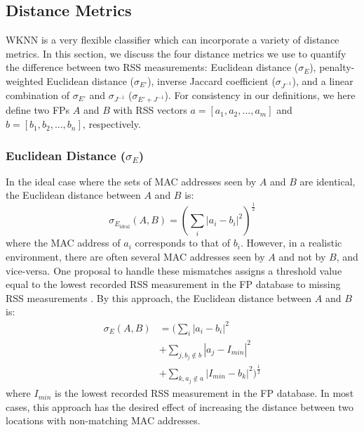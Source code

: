 \documentclass[conference]{IEEEtran}
\begin{document}
\subsection{Distance Metrics}\label{subsec:distance_metrics}
WKNN is a very flexible classifier which can incorporate a variety of distance metrics. In this section, we discuss the four distance metrics we use to quantify the difference between two RSS measurements: Euclidean distance ($\sigma_E$), penalty-weighted Euclidean distance ($\sigma_{E'}$), inverse Jaccard coefficient ($\sigma_{J^{-1}}$), and a linear combination of $\sigma_{E'}$ and $\sigma_{J^{-1}}$ ($\sigma_{E' + J^{-1}}$). For consistency in our definitions, we here define two FPs $A$ and $B$ with RSS vectors $a=[a_1, a_2, ... , a_m]$ and $b=[b_1, b_2, ... , b_n]$, respectively. 

\subsubsection{Euclidean Distance ($\sigma_E$)}

\indent In the ideal case where the sets of MAC addresses seen by $A$ and $B$ are identical, the Euclidean distance between $A$ and $B$ is:
\begin{equation}
\label{eq:euclidean_ideal}
\sigma_{E_{\text{ideal}}}(A, B) = (\sum\limits_{i}|a_i - b_i|^2)^\frac{1}{2}
\end{equation}
where the MAC address of $a_i$ corresponds to that of $b_i$. However, in a realistic environment, there are often several MAC addresses seen by $A$ and not by $B$, and vice-versa. One proposal to handle these mismatches assigns a threshold value equal to the lowest recorded RSS measurement in the FP database to missing RSS measurements \cite{Kemppi}. By this approach, the Euclidean distance between $A$ and $B$ is:
\begin{equation}
\label{eq:euclidean}
\begin{split}
\sigma_{E}(A, B) & = (\sum\limits_{i}|a_i-b_i|^2 \\
			& +  \sum\limits_{j, b_j\notin b}|a_j-I_{min}|^2 \\
			& + \sum\limits_{k, a_j\notin a}|I_{min}-b_k|^2)^\frac{1}{2}
\end{split}
\end{equation}
where $I_{min}$ is the lowest recorded RSS measurement in the FP database. In most cases, this approach has the desired effect of increasing the distance between two locations with non-matching MAC addresses.
\end{document}
